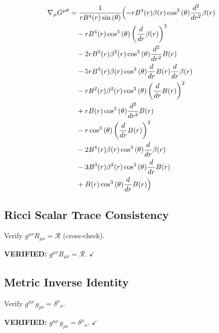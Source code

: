 \documentclass[11pt,a4paper]{article}
\begin{document}
\begin{align*}
  \nabla_\mu G^{\mu \theta} &= \frac{1}{r B^{4}{\left(r \right)} \sin{\left(\theta \right)}}\Bigl(- r B^{4}{\left(r \right)} \beta{\left(r \right)} \cos^{3}{\left(\theta \right)} \frac{d^{2}}{d r^{2}} \beta{\left(r \right)} \\
  &\quad - r B^{4}{\left(r \right)} \cos^{3}{\left(\theta \right)} \left(\frac{d}{d r} \beta{\left(r \right)}\right)^{2} \\
  &\quad - 2 r B^{3}{\left(r \right)} \beta^{2}{\left(r \right)} \cos^{3}{\left(\theta \right)} \frac{d^{2}}{d r^{2}} B{\left(r \right)} \\
  &\quad - 5 r B^{3}{\left(r \right)} \beta{\left(r \right)} \cos^{3}{\left(\theta \right)} \frac{d}{d r} B{\left(r \right)} \frac{d}{d r} \beta{\left(r \right)} \\
  &\quad - r B^{2}{\left(r \right)} \beta^{2}{\left(r \right)} \cos^{3}{\left(\theta \right)} \left(\frac{d}{d r} B{\left(r \right)}\right)^{2} \\
  &\quad + r B{\left(r \right)} \cos^{3}{\left(\theta \right)} \frac{d^{2}}{d r^{2}} B{\left(r \right)} \\
  &\quad - r \cos^{3}{\left(\theta \right)} \left(\frac{d}{d r} B{\left(r \right)}\right)^{2} \\
  &\quad - 2 B^{4}{\left(r \right)} \beta{\left(r \right)} \cos^{3}{\left(\theta \right)} \frac{d}{d r} \beta{\left(r \right)} \\
  &\quad - 3 B^{3}{\left(r \right)} \beta^{2}{\left(r \right)} \cos^{3}{\left(\theta \right)} \frac{d}{d r} B{\left(r \right)} \\
  &\quad + B{\left(r \right)} \cos^{3}{\left(\theta \right)} \frac{d}{d r} B{\left(r \right)}\Bigr)
\end{align*}
\subsection{Ricci Scalar Trace Consistency}
Verify $g^{\mu\nu} R_{\mu\nu} = \mathcal{R}$ (cross-check).
\begin{tcolorbox}[colback=boxgreen,colframe=black!40,title=\textbf{Trace Check},breakable]
\textbf{VERIFIED:} $g^{\mu\nu} R_{\mu\nu} = \mathcal{R}$. $\checkmark$
\end{tcolorbox}
\subsection{Metric Inverse Identity}
Verify $g^{\mu\rho}\,g_{\rho\nu} = \delta^\mu{}_\nu$.
\begin{tcolorbox}[colback=boxgreen,colframe=black!40,title=\textbf{Metric Inverse},breakable]
\textbf{VERIFIED:} $g^{\mu\rho}\,g_{\rho\nu} = \delta^\mu{}_\nu$. $\checkmark$
\end{tcolorbox}
\end{document}
